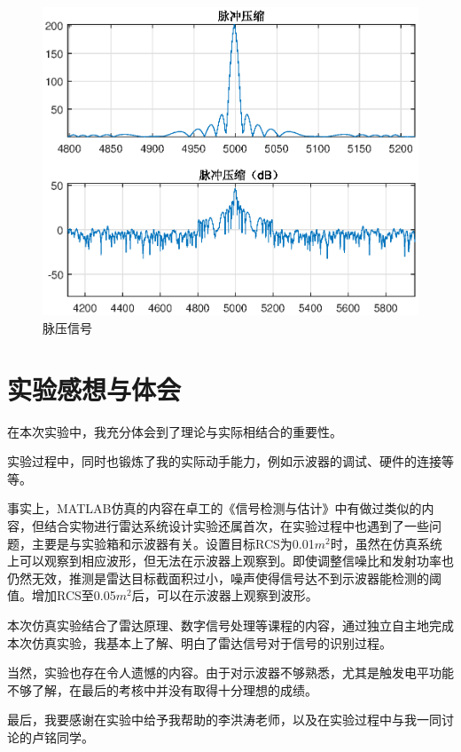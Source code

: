 \documentclass[12pt]{article}
\begin{document}
\begin{figure}[htbp]
  \centering
  \includegraphics[width=.8\textwidth]{maiyabox}
  \caption{脉压信号}\label{maiyabox}
\end{figure}

\section{实验感想与体会}
\setcounter{table}{0}\setcounter{figure}{0}\setcounter{equation}{0}
在本次实验中，我充分体会到了理论与实际相结合的重要性。\par
实验过程中，同时也锻炼了我的实际动手能力，例如示波器的调试、硬件的连接等等。
\par
事实上，MATLAB仿真的内容在卓工的《信号检测与估计》中有做过类似的内容，但结合实物进行雷达系统设计实验还属首次，在实验过程中也遇到了一些问题，主要是与实验箱和示波器有关。设置目标RCS为0.01$m^2$时，虽然在仿真系统上可以观察到相应波形，但无法在示波器上观察到。即使调整信噪比和发射功率也仍然无效，推测是雷达目标截面积过小，噪声使得信号达不到示波器能检测的阈值。增加RCS至0.05$m^2$后，可以在示波器上观察到波形。
\par
本次仿真实验结合了雷达原理、数字信号处理等课程的内容，通过独立自主地完成本次仿真实验，我基本上了解、明白了雷达信号对于信号的识别过程。\par
当然，实验也存在令人遗憾的内容。由于对示波器不够熟悉，尤其是触发电平功能不够了解，在最后的考核中并没有取得十分理想的成绩。\par
最后，我要感谢在实验中给予我帮助的李洪涛老师，以及在实验过程中与我一同讨论的卢铭同学。
\end{document}
